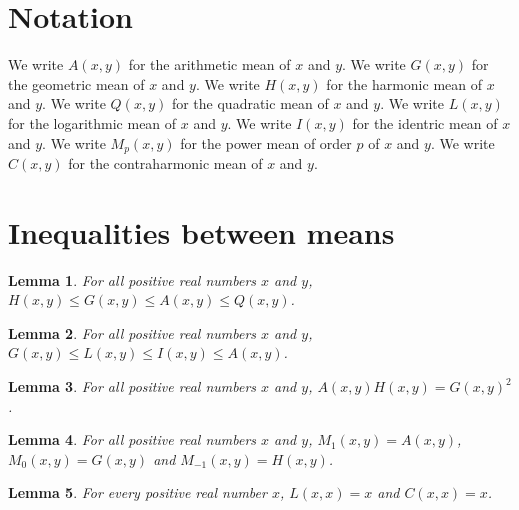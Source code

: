 \documentclass{article}
\newtheorem{lemma}{Lemma}
\begin{document}
\section{Notation}

We write $A(x,y)$ for the arithmetic mean of $x$ and $y$.
We write $G(x,y)$ for the geometric mean of $x$ and $y$.
We write $H(x,y)$ for the harmonic mean of $x$ and $y$.
We write $Q(x,y)$ for the quadratic mean of $x$ and $y$.
We write $L(x,y)$ for the logarithmic mean of $x$ and $y$.
We write $I(x,y)$ for the identric mean of $x$ and $y$.
We write $M_p(x,y)$ for the power mean of order $p$ of $x$ and $y$.
We write $C(x,y)$ for the contraharmonic mean of $x$ and $y$.

\section{Inequalities between means}

\begin{lemma}\label{chain}
For all positive real numbers $x$ and $y$, $H(x,y)\le G(x,y)\le A(x,y)\le Q(x,y)$.
\end{lemma}

\begin{lemma}\label{log}
For all positive real numbers $x$ and $y$, $G(x,y)\le L(x,y)\le I(x,y)\le A(x,y)$.
\end{lemma}

\begin{lemma}\label{product}
For all positive real numbers $x$ and $y$, $A(x,y)H(x,y)=G(x,y)^2$.
\end{lemma}

\begin{lemma}\label{power}
For all positive real numbers $x$ and $y$, $M_1(x,y)=A(x,y)$, $M_0(x,y)=G(x,y)$ and $M_{-1}(x,y)=H(x,y)$.
\end{lemma}

\begin{lemma}\label{equal}
For every positive real number $x$, $L(x,x)=x$ and $C(x,x)=x$.
\end{lemma}
\end{document}
